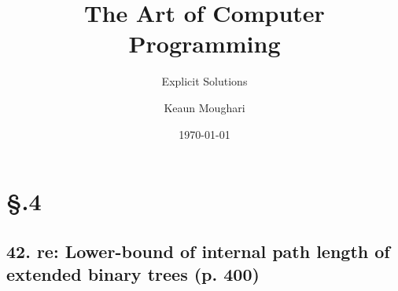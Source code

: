 \documentclass[fontsize=11pt, paper=a4]{scrartcl}
\begin{document}

\title{The Art of Computer Programming}
\subtitle{\LARGE Explicit Solutions}
\author{Keaun Moughari} 
\date{\today} 
\maketitle

\setlength{\linewidth}{0.92\linewidth}

\section*{\S {}.4}\label{part: 1.2.4}
\subsection*{42. re: Lower-bound of internal path length of extended binary trees (p. 400)}\label{num: 42}
\end{document}
